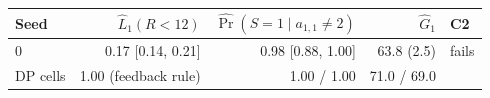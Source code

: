 \begin{tabular}{lrrrl}
\toprule
Seed & $\hat L_1(R<12)$ & $\widehat{\Pr}(S=1\mid a_{1,1}\ne 2)$ & $\hat G_1$ & C2 \\
\midrule
0 & 0.17 [0.14, 0.21] & 0.98 [0.88, 1.00] & 63.8 (2.5) & fails \\
\midrule
DP cells & 1.00 (feedback rule) & 1.00 / 1.00 & 71.0 / 69.0 & \\
\bottomrule
\end{tabular}
